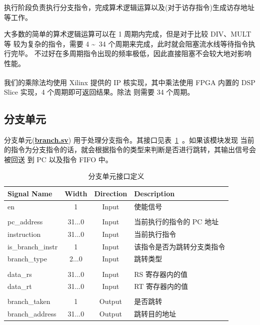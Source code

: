\documentclass[blue,normal,cn,hide]{elegantbook}
\begin{document}
执行阶段负责执行分支指令，完成算术逻辑运算以及(对于访存指令)生成访存地址
等工作。

大多数的简单的算术逻辑运算可以在 1 周期内完成，但是对于比较 DIV、MULT 等
较为复杂的指令，需要 4 \textasciitilde\  34 个周期来完成，此时就会阻塞流水线等待指令执行完毕。
不过好在多周期指令出现的频率极低，因此直接阻塞不会较大地对影响性能。

我们的乘除法均使用 Xilinx\textsuperscript{\textregistered} 提供的 IP
核实现，其中乘法使用 FPGA 内置的 DSP Slice 实现，4 个周期即可返回结果。除法
则需要 34 个周期。

\subsection{分支单元}

分支单元(\href{https://github.com/name1e5s/Sirius/blob/master/branch.sv}{\textbf{branch.sv}})
用于处理分支指令。其接口见表~\ref{tab:BranchUnitInterface}~。如果该模块发现
当前的指令为分支指令的话，就会根据指令的类型来判断是否进行跳转，其输出信号会被回送
到 PC 以及指令 FIFO 中。

\begin{table}
    \renewcommand\arraystretch{1.25}
    \centering
    \begin{tabular}{lccm{}}
        \toprule 
        \rowcolor{black!20} \textbf{Signal Name} & \textbf{Width} & \textbf{Direction} & \textbf{Description} \\
        \midrule
        en & 1 & Input & 使能信号 \\
        \\
        pc\_address & 31...0 & Input & 当前执行的指令的 PC 地址 \\
        instruction & 31...0 & Input & 当前执行指令 \\
        is\_branch\_instr & 1 & Input & 该指令是否为跳转分支类指令 \\
        branch\_type & 2...0 & Input & 跳转类型 \\
        \\
        data\_rs & 31...0 & Input & RS 寄存器内的值 \\
        data\_rt & 31...0 & Input & RT 寄存器内的值 \\
        \\
        branch\_taken & 1 & Output & 是否跳转 \\
        branch\_address & 31...0 & Output & 跳转目的地址 \\
        \bottomrule
    \end{tabular}
    \caption{分支单元接口定义}
    \label{tab:BranchUnitInterface}
\end{table}
\end{document}
